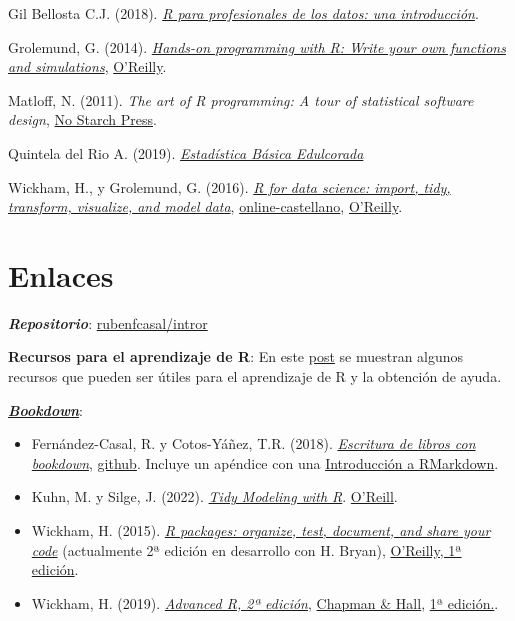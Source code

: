 \documentclass[
]{book}
\theoremstyle{break}
\theoremstyle{nonumberplain}
\begin{document}
Gil Bellosta C.J. (2018). \emph{\href{https://www.datanalytics.com/libro_r/index.html}{R para profesionales de los datos: una introducción}}.

Grolemund, G. (2014). \emph{\href{https://rstudio-education.github.io/hopr}{Hands-on programming with R: Write your own functions and simulations}}, \href{http://shop.oreilly.com/product/0636920028574.do}{O'Reilly}.

Matloff, N. (2011). \emph{The art of R programming: A tour of statistical software design}, \href{https://www.nostarch.com/artofr.htm}{No Starch Press}.

Quintela del Rio A. (2019). \emph{\href{https://bookdown.org/aquintela/EBE}{Estadística Básica Edulcorada}}

Wickham, H., y Grolemund, G. (2016). \emph{\href{http://r4ds.had.co.nz}{R for data science: import, tidy, transform, visualize, and model data}}, \href{https://es.r4ds.hadley.nz}{online-castellano}, \href{http://shop.oreilly.com/product/0636920034407.do}{O'Reilly}.

\hypertarget{links}{%
\section*{Enlaces}\label{links}}

\textbf{\emph{Repositorio}}: \href{https://github.com/rubenfcasal/intror}{rubenfcasal/intror}

\textbf{Recursos para el aprendizaje de R}: En este \href{https://rubenfcasal.github.io/post/ayuda-y-recursos-para-el-aprendizaje-de-r}{post} se muestran algunos recursos que pueden ser útiles para el aprendizaje de R y la obtención de ayuda.

\href{https://bookdown.org}{\textbf{\emph{Bookdown}}}:

\begin{itemize}
\item
  Fernández-Casal, R. y Cotos-Yáñez, T.R. (2018). \emph{\href{https://rubenfcasal.github.io/bookdown_intro}{Escritura de libros con bookdown}}, \href{https://github.com/rubenfcasal/bookdown_intro}{github}. Incluye un apéndice con una \href{https://rubenfcasal.github.io/bookdown_intro/rmarkdown.html}{Introducción a RMarkdown}.
\item
  Kuhn, M. y Silge, J. (2022). \emph{\href{https://www.tmwr.org}{Tidy Modeling with R}}. \href{https://amzn.to/35Hn96s}{O'Reill}.
\item
  Wickham, H. (2015). \emph{\href{http://r-pkgs.had.co.nz/}{R packages: organize, test, document, and share your code}} (actualmente 2ª edición en desarrollo con H. Bryan), \href{http://shop.oreilly.com/product/0636920034421.do}{O'Reilly, 1ª edición}.
\item
  Wickham, H. (2019). \emph{\href{https://adv-r.hadley.nz/}{Advanced R, 2ª edición}}, \href{https://www.amazon.com/dp/0815384572}{Chapman \& Hall}, \href{http://adv-r.had.co.nz/}{1ª edición.}.
\end{itemize}
\end{document}

